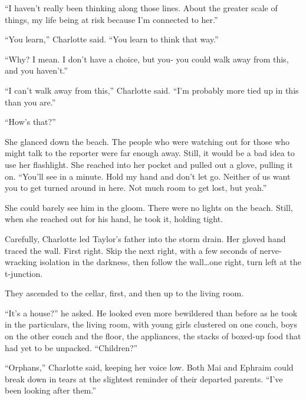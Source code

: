 ``I haven't really been thinking along those lines.  About the greater scale of things, my life being at risk because I'm connected to her.''



``You learn,'' Charlotte said.  ``You learn to think that way.''



``Why?  I mean.  I don't have a choice, but you- you could walk away from this, and you haven't.''



``I can't walk away from this,'' Charlotte said.  ``I'm probably more tied up in this than you are.''



``How's that?''



She glanced down the beach.  The people who were watching out for those who might talk to the reporter were far enough away.  Still, it would be a bad idea to use her flashlight.  She reached into her pocket and pulled out a glove, pulling it on.  ``You'll see in a minute.  Hold my hand and don't let go.  Neither of us want you to get turned around in here.  Not much room to get lost, but yeah.''



She could barely see him in the gloom.  There were no lights on the beach.  Still, when she reached out for his hand, he took it, holding tight.



Carefully, Charlotte led Taylor's father into the storm drain.  Her gloved hand traced the wall.  First right.  Skip the next right, with a few seconds of nerve-wracking isolation in the darkness, then follow the wall\ldots one right, turn left at the t-junction.



They ascended to the cellar, first, and then up to the living room.



``It's a house?'' he asked.  He looked even more bewildered than before as he took in the particulars, the living room, with young girls clustered on one couch, boys on the other couch and the floor, the appliances, the stacks of boxed-up food that had yet to be unpacked.  ``Children?''



``Orphans,'' Charlotte said, keeping her voice low.  Both Mai and Ephraim could break down in tears at the slightest reminder of their departed parents.  ``I've been looking after them.''



